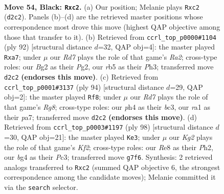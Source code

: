 \documentclass[11pt]{article}
\begin{document}
\clearpage

\begin{figure}[p]\centering
\begin{subfigure}{0.46\textwidth}\centering
\resizebox{\linewidth}{!}{%
\newchessgame
\chessboard[
  setfen={4r3/5pk1/6p1/1R6/6BP/1P6/2Pr2b1/R5K1 b - - 4 54},
  showmover=false,
  pgfstyle=straightmove, color=movearrow, markmove={d2-c2}
]}
\caption{}
\end{subfigure}\hfill
\begin{subfigure}{0.46\textwidth}\centering
\resizebox{\linewidth}{!}{%
\newchessgame
\chessboard[
  setfen={8/pbr2k1N/1p4p1/1P6/8/7P/R5P1/6K1 w - - 2 47},
  showmover=false,
  pgfstyle=straightmove, color=movearrow, markmove={a2-a7}
]}
\caption{}
\end{subfigure}
\\[4pt]
\begin{subfigure}{0.46\textwidth}\centering
\resizebox{\linewidth}{!}{%
\newchessgame
\chessboard[
  setfen={6R1/p2r3p/7P/5p2/7k/2b1BP2/4K3/8 w - - 2 48},
  showmover=false,
  pgfstyle=straightmove, color=movearrow, markmove={g8-f8}
]}
\caption{}
\end{subfigure}\hfill
\begin{subfigure}{0.46\textwidth}\centering
\resizebox{\linewidth}{!}{%
\newchessgame
\chessboard[
  setfen={6k1/R5B1/2r3p1/1b3p1p/8/2P2P2/5KPP/8 w - - 18 50},
  showmover=false,
  pgfstyle=straightmove, color=movearrow, markmove={f2-e3}
]}
\caption{}
\end{subfigure}
\caption{\textbf{Move 54, Black: \texttt{Rxc2}.} (a) Our position; Melanie plays \texttt{Rxc2} (\texttt{d2c2}). Panels (b)--(d) are the retrieved master positions whose correspondence most drove this move (highest QAP objective among those that transfer to it). (b) Retrieved from \texttt{ccrl\_top\_p0000\#1104} (ply 92) [structural distance $d$=32, QAP obj=4]: the master played \texttt{Rxa7}; under $\mu$ our \emph{Rd7} plays the role of that game's \emph{Ra2}; cross-type roles: our \emph{B}g2 as their \emph{P}g2, our \emph{r}b5 as their \emph{P}h3; transferred move \texttt{d2c2} \textbf{(endorses this move)}. (c) Retrieved from \texttt{ccrl\_top\_p0001\#3137} (ply 94) [structural distance $d$=29, QAP obj=2]: the master played \texttt{Rf8}; under $\mu$ our \emph{Rd7} plays the role of that game's \emph{Rg8}; cross-type roles: our \emph{p}h4 as their \emph{b}c3, our \emph{r}a1 as their \emph{p}a7; transferred move \texttt{d2c2} \textbf{(endorses this move)}. (d) Retrieved from \texttt{ccrl\_top\_p0003\#1197} (ply 98) [structural distance $d$=30, QAP obj=21]: the master played \texttt{Ke3}; under $\mu$ our \emph{Kg2} plays the role of that game's \emph{Kf2}; cross-type roles: our \emph{R}e8 as their \emph{P}h2, our \emph{b}g4 as their \emph{P}c3; transferred move \texttt{g7f6}. Synthesis: 2 retrieved analogs transferred to \texttt{Rxc2} (summed QAP objective 6, the strongest correspondence among the candidate moves); Melanie committed it via the \texttt{search} selector.}
\label{fig:thought-m107}
\end{figure}
\end{document}

